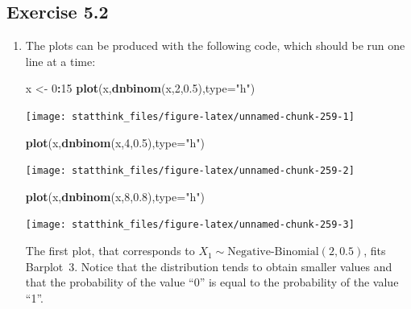 \documentclass[]{krantz}
\makeatletter
\newenvironment{Shaded}{\begin{snugshade}}{\end{snugshade}}
\newcommand{\DataTypeTok}[1]{\textcolor[rgb]{0.13,0.29,0.53}{#1}}
\newcommand{\DecValTok}[1]{\textcolor[rgb]{0.00,0.00,0.81}{#1}}
\newcommand{\FloatTok}[1]{\textcolor[rgb]{0.00,0.00,0.81}{#1}}
\newcommand{\KeywordTok}[1]{\textcolor[rgb]{0.13,0.29,0.53}{\textbf{#1}}}
\newcommand{\NormalTok}[1]{#1}
\newcommand{\OperatorTok}[1]{\textcolor[rgb]{0.81,0.36,0.00}{\textbf{#1}}}
\newcommand{\StringTok}[1]{\textcolor[rgb]{0.31,0.60,0.02}{#1}}
\newenvironment{kframe}{%
\medskip{}
\setlength{\fboxsep}{.8em}
 \def\at@end@of@kframe{}%
 \ifinner\ifhmode%
  \def\at@end@of@kframe{\end{minipage}}%
  \begin{minipage}{\columnwidth}%
 \fi\fi%
 \def\FrameCommand##1{\hskip\@totalleftmargin \hskip-\fboxsep
 \colorbox{shadecolor}{##1}\hskip-\fboxsep
     \hskip-\linewidth \hskip-\@totalleftmargin \hskip\columnwidth}%
 \MakeFramed {\advance\hsize-\width
   \@totalleftmargin\z@ \linewidth\hsize
   \@setminipage}}%
 {\par\unskip\endMakeFramed%
 \at@end@of@kframe}
\renewenvironment{Shaded}{\begin{kframe}}{\end{kframe}}
\theoremstyle{definition}
\theoremstyle{definition}
\theoremstyle{definition}
\theoremstyle{remark}
\makeatother
\begin{document}
\hypertarget{exercise-5.2}{%
\subsection*{Exercise 5.2}\label{exercise-5.2}}


\begin{enumerate}
\def\labelenumi{\arabic{enumi}.}
\item
  The plots can be produced with the
  following code, which should be run one line at a time:

\begin{Shaded}
\begin{Highlighting}[]
\NormalTok{x <-}\StringTok{ }\DecValTok{0}\OperatorTok{:}\DecValTok{15}
\KeywordTok{plot}\NormalTok{(x,}\KeywordTok{dnbinom}\NormalTok{(x,}\DecValTok{2}\NormalTok{,}\FloatTok{0.5}\NormalTok{),}\DataTypeTok{type=}\StringTok{"h"}\NormalTok{)}
\end{Highlighting}
\end{Shaded}

  \begin{center}\texttt{[image: statthink\_files/figure-latex/unnamed-chunk-259-1]} \end{center}

\begin{Shaded}
\begin{Highlighting}[]
\KeywordTok{plot}\NormalTok{(x,}\KeywordTok{dnbinom}\NormalTok{(x,}\DecValTok{4}\NormalTok{,}\FloatTok{0.5}\NormalTok{),}\DataTypeTok{type=}\StringTok{"h"}\NormalTok{)}
\end{Highlighting}
\end{Shaded}

  \begin{center}\texttt{[image: statthink\_files/figure-latex/unnamed-chunk-259-2]} \end{center}

\begin{Shaded}
\begin{Highlighting}[]
\KeywordTok{plot}\NormalTok{(x,}\KeywordTok{dnbinom}\NormalTok{(x,}\DecValTok{8}\NormalTok{,}\FloatTok{0.8}\NormalTok{),}\DataTypeTok{type=}\StringTok{"h"}\NormalTok{)}
\end{Highlighting}
\end{Shaded}

  \begin{center}\texttt{[image: statthink\_files/figure-latex/unnamed-chunk-259-3]} \end{center}

  The first plot, that corresponds to
  \(X_1 \sim \mbox{Negative-Binomial}(2,0.5)\), fits Barplot~3. Notice that
  the distribution tends to obtain smaller values and that the probability
  of the value ``0'' is equal to the probability of the value ``1''.


\end{enumerate}
\end{document}
